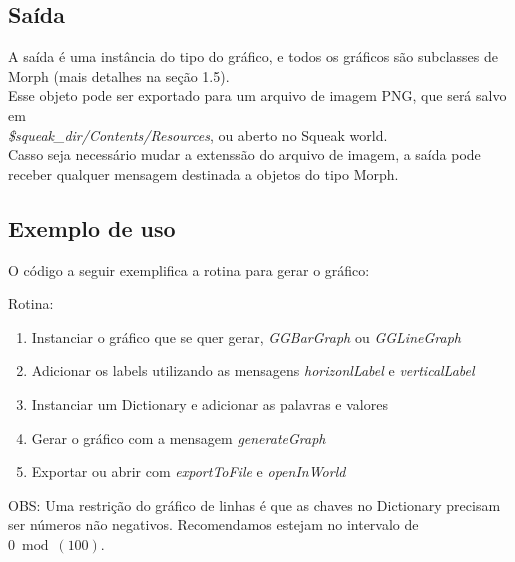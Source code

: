 	\subsection{Saída}
	
		A saída é uma instância do tipo do gráfico, e todos os gráficos são subclasses de Morph (mais detalhes na seção 1.5).\\

		Esse objeto pode ser exportado para um arquivo de imagem PNG, que será salvo em\\\emph{\$squeak\_dir/Contents/Resources}, ou aberto no Squeak world.\\

		Casso seja necessário mudar a extenssão do arquivo de imagem, a saída pode receber qualquer mensagem destinada a objetos do tipo Morph.

	
	\subsection{Exemplo de uso}
		O código a seguir exemplifica a rotina para gerar o gráfico:\\


		Rotina:
		\begin{enumerate}
			\item Instanciar o gráfico que se quer gerar, \emph{GGBarGraph} ou \emph{GGLineGraph}
			\item Adicionar os labels utilizando as mensagens \emph{horizonlLabel} e \emph{verticalLabel}
			\item Instanciar um Dictionary e adicionar as palavras e valores
			\item Gerar o gráfico com a mensagem \emph{generateGraph}
			\item Exportar ou abrir com \emph{exportToFile} e \emph{openInWorld}
		\end{enumerate}

		OBS: Uma restrição do gráfico de linhas é que as chaves no Dictionary precisam ser números não negativos. Recomendamos estejam no intervalo de $0 \bmod(100)$.\\

